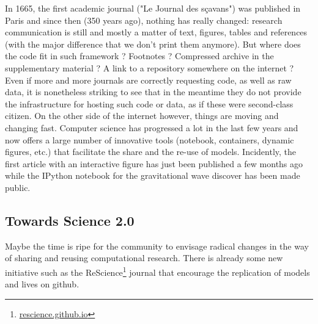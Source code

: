 \documentclass[jou]{apa6}
\begin{document}
In 1665, the first academic journal ("Le Journal des sçavans") was published in
Paris and since then (350 years ago), nothing has really changed: research
communication is still and mostly a matter of text, figures, tables and
references (with the major difference that we don't print them anymore). But
where does the code fit in such framework ? Footnotes ? Compressed archive in
the supplementary material ? A link to a repository somewhere on the internet ?
Even if more and more journals are correctly requesting code, as well as raw
data, it is nonetheless striking to see that in the meantime they do not
provide the infrastructure for hosting such code or data, as if these were
second-class citizen. On the other side of the internet however, things are
moving and changing fast. Computer science has progressed a lot in the last few
years and now offers a large number of innovative tools (notebook, containers,
dynamic figures, etc.) that facilitate the share and the re-use of
models. Incidently, the first article with an interactive figure has just been
published a few months ago while the IPython notebook for the gravitational
wave discover has been made public.

\subsection*{Towards Science 2.0}

Maybe the time is ripe for the community to envisage radical changes in the
way of sharing and reusing computational research. There is already some new
initiative such as the ReScience\footnote{\url{rescience.github.io}} journal
that encourage the replication of models and lives on github.






\hspace*{1cm}
\end{document}
